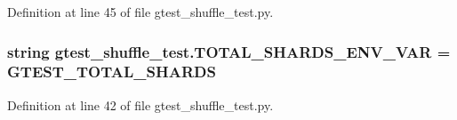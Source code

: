 Definition at line 45 of file gtest\+\_\+shuffle\+\_\+test.\+py.

\subsubsection[{\texorpdfstring{T\+O\+T\+A\+L\+\_\+\+S\+H\+A\+R\+D\+S\+\_\+\+E\+N\+V\+\_\+\+V\+AR}{TOTAL_SHARDS_ENV_VAR}}]{\setlength{\rightskip}{0pt plus 5cm}string gtest\+\_\+shuffle\+\_\+test.\+T\+O\+T\+A\+L\+\_\+\+S\+H\+A\+R\+D\+S\+\_\+\+E\+N\+V\+\_\+\+V\+AR = \textquotesingle{}G\+T\+E\+S\+T\+\_\+\+T\+O\+T\+A\+L\+\_\+\+S\+H\+A\+R\+DS\textquotesingle{}}\hypertarget{namespacegtest__shuffle__test_a29088c2bb51a4550fa2a668d972f973a}{}\label{namespacegtest__shuffle__test_a29088c2bb51a4550fa2a668d972f973a}


Definition at line 42 of file gtest\+\_\+shuffle\+\_\+test.\+py.

